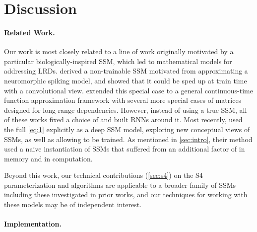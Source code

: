 \documentclass{article}
\newcommand{\methodabbrv}{S4}
\begin{document}


\newpage

\appendix


\section{Discussion}
\label{sec:discussion}


\paragraph{Related Work.}
Our work is most closely related to a line of work originally motivated by a particular biologically-inspired SSM, which led to mathematical models for addressing LRDs. \citet{voelker2019dynamical,voelker2019legendre} derived a non-trainable SSM motivated from approximating a neuromorphic spiking model, and \citet{chilkuri2021parallelizing} showed that it could be sped up at train time with a convolutional view.
\citet{gu2020hippo} extended this special case to a general continuous-time function approximation framework with several more special cases of  matrices designed for long-range dependencies.
However, instead of using a true SSM, all of these works fixed a choice of  and built RNNs around it.
Most recently, \citet{gu2021lssl} used the full \eqref{eq:1} explicitly as a deep SSM model, exploring new conceptual views of SSMs, as well as allowing   to be trained.
As mentioned in \cref{sec:intro}, their method used a naive instantiation of SSMs that suffered from an additional factor of  in memory and  in computation.

Beyond this work, our technical contributions (\cref{sec:s4}) on the \methodabbrv{} parameterization and algorithms are applicable to a broader family of SSMs including these investigated in prior works,
and our techniques for working with these models may be of independent interest.


\paragraph{Implementation.}
\end{document}

